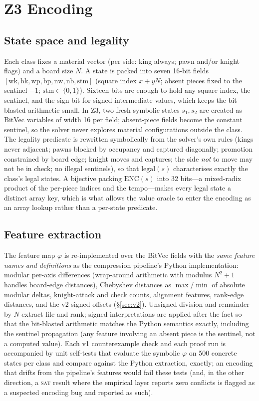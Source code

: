 \documentclass[conference]{IEEEtran}
\begin{document}
\section{Z3 Encoding}
\label{sec:encoding}

\subsection{State space and legality}
Each class fixes a material vector (per side: king always; pawn and/or
knight flags) and a board size $N$. A state is packed into seven 16-bit
fields $[\mathrm{wk}, \mathrm{bk}, \mathrm{wp}, \mathrm{bp}, \mathrm{nw},
\mathrm{nb}, \mathrm{stm}]$ (square index $x + yN$; absent pieces fixed to
the sentinel $-1$; $\mathrm{stm} \in \{0,1\}$). Sixteen bits are enough to
hold any square index, the sentinel, and the sign bit for signed
intermediate values, which keeps the bit-blasted arithmetic small. In Z3,
two fresh symbolic states $s_1, s_2$ are created as BitVec variables of
width 16 per field; absent-piece fields become the constant sentinel, so
the solver never explores material configurations outside the class. The
legality predicate is rewritten symbolically from the solver's own
rules (kings never adjacent; pawns blocked by occupancy and captured
diagonally; promotion constrained by board edge; knight moves and captures;
the side \emph{not} to move may not be in check; no illegal sentinels), so
that $\mathrm{legal}(s)$ characterises exactly the class's legal states.
A bijective packing $\mathrm{ENC}(s)$ into 32 bits---a mixed-radix product
of the per-piece indices and the tempo---makes every legal state a distinct
array key, which is what allows the value oracle to enter the encoding as
an array lookup rather than a per-state predicate.

\subsection{Feature extraction}
The feature map $\varphi$ is re-implemented over the BitVec fields with the
\emph{same feature names and definitions} as the compression pipeline's
Python implementation: modular per-axis differences (wrap-around arithmetic
with modulus $N^2{+}1$ handles board-edge distances), Chebyshev distances as
$\max$/$\min$ of absolute modular deltas, knight-attack and check counts,
alignment features, rank-edge distances, and the v2 signed offsets
(\S\ref{sec:v2}). Unsigned division and remainder by $N$ extract file and
rank; signed interpretations are applied after the fact so that the
bit-blasted arithmetic matches the Python semantics exactly, including the
sentinel propagation (any feature involving an absent piece is the
sentinel, not a computed value). Each v1 counterexample check and each
proof run is accompanied by unit self-tests that evaluate the symbolic
$\varphi$ on 500 concrete states per class and compare against the Python
extraction, exactly; an encoding that drifts from the pipeline's features
would fail these tests (and, in the other direction, a \textsc{sat} result
where the empirical layer reports zero conflicts is flagged as a suspected
encoding bug and reported as such).
\end{document}
